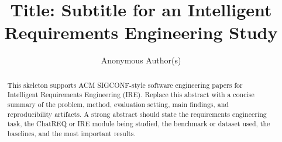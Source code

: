 \documentclass[sigconf,review,anonymous]{../acmart-primary/acmart}
\begin{document}
\title[IRE Group Paper]{Title: Subtitle for an Intelligent Requirements Engineering Study}

\author{Anonymous Author(s)}

\renewcommand{\shortauthors}{Anonymous et al.}

\begin{abstract}
This skeleton supports ACM SIGCONF-style software engineering papers for Intelligent Requirements Engineering (IRE). Replace this abstract with a concise summary of the problem, method, evaluation setting, main findings, and reproducibility artifacts. A strong abstract should state the requirements engineering task, the ChatREQ or IRE module being studied, the benchmark or dataset used, the baselines, and the most important results.
\end{abstract}



\maketitle












\end{document}
